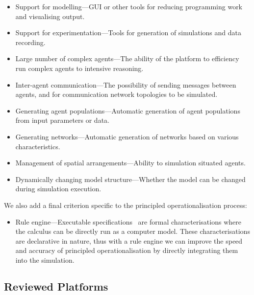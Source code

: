 \begin{itemize}
\item Support for modelling---\ac{GUI} or other tools for reducing programming work and visualising output.
\item Support for experimentation---Tools for generation of simulations and data recording.
\item Large number of complex agents---The ability of the platform to efficiency run complex agents to intensive reasoning.
\item Inter-agent communication---The possibility of sending messages between agents, and for communication network topologies to be simulated.
\item Generating agent populations---Automatic generation of agent populations from input parameters or data.
\item Generating networks---Automatic generation of networks based on various characteristics.
\item Management of spatial arrangements---Ability to simulation situated agents.
\item Dynamically changing model structure---Whether the model can be changed during simulation execution.
\end{itemize}

We also add a final criterion specific to the principled operationalisation process:
\begin{itemize}
\item Rule engine---Executable specifications~\citep{Artikis2010} are formal characterisations where the calculus can be directly run as a computer model. These characterisations are declarative in nature, thus with a rule engine we can improve the speed and accuracy of principled operationalisation by directly integrating them into the simulation.
\end{itemize}

\subsection{Reviewed Platforms}

